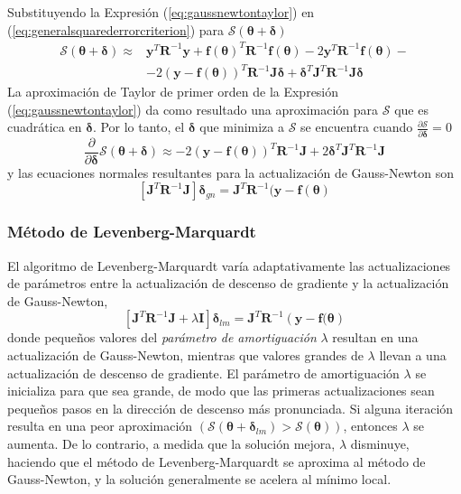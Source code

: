 Substituyendo la Expresión (\ref{eq:gaussnewtontaylor}) en (\ref{eq:generalsquarederrorcriterion}) para $\mathscr{S}(\bm{\theta} + \bm{\delta})$
\begin{equation}
    \begin{aligned}
        \mathscr{S}(\bm{\theta}+\bm{\delta}) \approx{} &\bm{y}^T\bm{R}^{-1}\bm{y} + \bm{f}(\bm{\theta})^T\bm{R}^{-1}\bm{f}(\bm{\theta}) - 2\bm{y}^T\bm{R}^{-1}\bm{f}(\bm{\theta}) - \\
        & -2\left(\bm{y} - \bm{f}(\bm{\theta})\right)^T\bm{R}^{-1}\bm{J}\bm{\delta} + \bm{\delta}^T\bm{J}^T\bm{R}^{-1}\bm{J}\bm{\delta}
    \end{aligned}
\end{equation}
La aproximación de Taylor de primer orden  de la Expresión (\ref{eq:gaussnewtontaylor}) da como resultado una aproximación para $\mathscr{S}$ que es cuadrática en $\bm{\delta}$. Por lo tanto, el $\bm{\delta}$ que minimiza a $\mathscr{S}$ se encuentra cuando $\frac{\partial \mathscr{S}}{\partial \bm{\delta}} = 0$
\begin{equation}
    \frac{\partial}{\partial \bm{\delta}}\mathscr{S}(\bm{\theta} + \bm{\delta}) \approx -2\left(\bm{y} - \bm{f}(\bm{\theta})\right)^T\bm{R}^{-1}\bm{J} + 2\bm{\delta}^T\bm{J}^T\bm{R}^{-1}\bm{J}
\end{equation}
y las ecuaciones normales resultantes para la actualización de Gauss-Newton son
\begin{equation}
    \left[\bm{J}^T\bm{R}^{-1}\bm{J}\right]\bm{\delta}_{gn} = \bm{J}^T\bm{R}^{-1}(\bm{y} - \bm{f}(\bm{\theta})
\end{equation}

\subsubsection{Método de Levenberg-Marquardt}
El algoritmo de Levenberg-Marquardt varía adaptativamente las actualizaciones de parámetros entre la actualización de descenso de gradiente y la actualización de Gauss-Newton,
\begin{equation}
    \left[\bm{J}^T\bm{R}^{-1}\bm{J} + \lambda\bm{I}\right]\bm{\delta}_{lm} = \bm{J}^T\bm{R}^{-1}\left(\bm{y} - \bm{f}(\bm{\theta}\right)
\end{equation}{}
donde pequeños valores del \textit{parámetro de amortiguación} $\lambda$ resultan en una actualización de Gauss-Newton, mientras que valores grandes de $\lambda$ llevan a una actualización de descenso de gradiente. El parámetro de amortiguación $\lambda$ se inicializa para que sea grande, de modo que las primeras actualizaciones sean pequeños pasos en la dirección de descenso más pronunciada. Si alguna iteración resulta en una peor aproximación $(\mathscr{S}(\bm{\theta} + \bm{\delta}_{lm}) > \mathscr{S}({\bm{\theta}}))$, entonces $\lambda$ se aumenta. De lo contrario, a medida que la solución mejora, $\lambda$ disminuye, haciendo que el método de Levenberg-Marquardt se aproxima al método de Gauss-Newton, y la solución generalmente se acelera al mínimo local.

